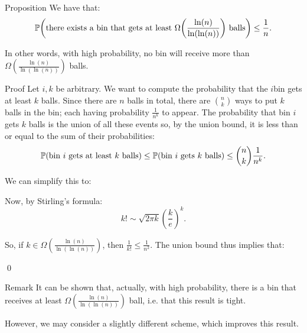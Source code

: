\documentclass[a4paper]{article}
\begin{document}
\begin{parag}{Proposition}
    We have that:
    \[\prob\left(\text{there exists a bin that gets at least $\Omega\left(\frac{\ln\left(n\right)}{\ln\left(\ln\left(n\right)\right)}\right)$ balls}\right) \leq \frac{1}{n}.\]

    In other words, with high probability, no bin will receive more than $\Omega\left(\frac{\ln\left(n\right)}{\ln\left(\ln\left(n\right)\right)}\right)$ balls.

    \begin{subparag}{Proof}
        Let $i, k$  be arbitrary. We want to compute the probability that the $i$\Th bin gets at least $k$ balls. Since there are $n$ balls in total, there are $\binom{n}{k}$ ways to put $k$ balls in the bin; each having probability $\frac{1}{n^k}$ to appear. The probability that bin $i$ gets $k$ balls is the union of all these events so, by the union bound, it is less than or equal to the sum of their probabilities:
        \[\prob\left(\text{bin $i$ gets at least $k$ balls}\right) \leq \prob\left(\text{bin $i$ gets $k$ balls}\right) \leq \binom{n}{k} \frac{1}{n^k}.\]

        We can simplify this to:
        
        Now, by Stirling's formula: 
        \[k! \sim \sqrt{2\pi k} \left(\frac{k}{e}\right)^k.\]

        So, if $k \in \Omega\left(\frac{\ln\left(n\right)}{\ln\left(\ln\left(n\right)\right)}\right)$, then $\frac{1}{k!} \leq \frac{1}{n^2}$. The union bound thus implies that:
        
        \qed
    \end{subparag}

    \begin{subparag}{Remark}
        It can be shown that, actually, with high probability, there is a bin that receives at least $\Omega\left(\frac{\ln\left(n\right)}{\ln\left(\ln\left(n\right)\right)}\right)$ ball, i.e. that this result is tight.

        However, we may consider a slightly different scheme, which improves this result.
    \end{subparag}
\end{parag}
\end{document}
